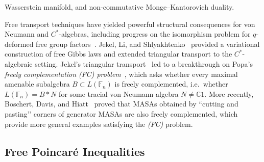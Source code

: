 \documentclass[10pt,a4paper,reqno]{amsart}
\begin{document}
Wasserstein manifold, and non\mbox{-}commutative Monge--Kantorovich duality.
\par\vspace{0.5em}
Free transport techniques have yielded powerful structural consequences for von Neumann
and $C^\ast$-algebras, including progress on the isomorphism problem for $q$-deformed free
group factors~\cite{GS}.  Jekel, Li, and Shlyakhtenko~\cite{Jek4} provided a variational
construction of free Gibbs laws and extended triangular transport to the $C^\ast$-algebraic
setting.  Jekel’s triangular transport~\cite{Jek1} led to a breakthrough on Popa’s
\emph{freely complementation (FC) problem}~\cite{Popa}, which asks whether every maximal
amenable subalgebra $B\subset L(\mathbb{F}_n)$ is freely complemented, i.e.\ whether
$L(\mathbb{F}_n)=B * N$ for some tracial von Neumann algebra $N\neq \mathbb{C}1$.
More recently, Boschert, Davis, and Hiatt~\cite{freely} proved that MASAs obtained by
``cutting and pasting’’ corners of generator MASAs are also freely complemented, which provide more general examples satisfying the \emph{(FC)} problem.
  

\subsection{Free Poincaré Inequalities}
\end{document}
